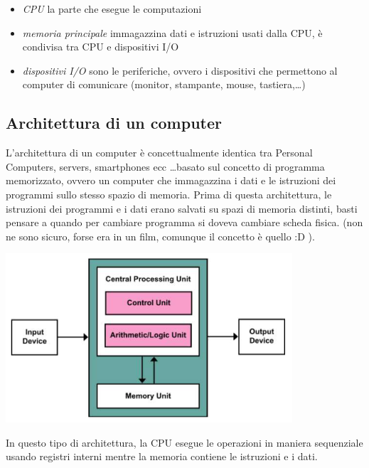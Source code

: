 \documentclass{article}
\begin{document}
    \begin{itemize}

        \item \textit{CPU}
         la parte che esegue le computazioni

        \item\textit{memoria principale}
        immagazzina dati e istruzioni usati dalla CPU, è condivisa tra CPU e dispositivi I/O

        \item\textit{dispositivi I/O}
        sono le periferiche, ovvero i dispositivi che permettono al computer di comunicare (monitor, stampante, mouse, tastiera,\ldots)

    \end{itemize}

    
    \subsection{Architettura di un computer}
        L'architettura di un computer è concettualmente identica tra Personal Computers, servers, smartphones ecc \ldots basato sul concetto di programma memorizzato, ovvero un computer che immagazzina i dati e le istruzioni dei programmi sullo stesso spazio di memoria. Prima di questa architettura, le istruzioni dei programmi e i dati erano salvati su spazi di memoria distinti, basti pensare a quando per cambiare programma si doveva cambiare scheda fisica. (non ne sono sicuro, forse era in un film, comunque il concetto è quello :D ).

        \begin{center}
        \includegraphics[width=0.8\textwidth]{immagini/architettura von neuman.png}
        \end{center}
        In questo tipo di architettura, la CPU esegue le operazioni in maniera sequenziale usando registri interni mentre la memoria contiene le istruzioni e i dati.
\end{document}
